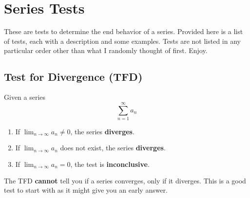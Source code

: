 \documentclass[12pt]{report}
\begin{document}
\clearpage











\chapter{Series Tests}
These are tests to determine the end behavior of a series. Provided here is a list of tests, each with a description and some examples. Tests are not listed in any particular order other than what I randomly thought of first. Enjoy.




\section{Test for Divergence (TFD)}
Given a series
    $$\sum_{n=1}^\infty a_n$$

\begin{enumerate}
	\item If $ \lim_{n\to\infty} a_n \neq 0 $, the series \textbf{diverges}.
	\item If $ \lim_{n\to\infty} a_n $ does not exist, the series \textbf{diverges}.
	\item If $ \lim_{n\to\infty} a_n = 0 $, the test is \textbf{inconclusive}.
\end{enumerate}

\noindent The TFD \textbf{cannot} tell you if a series converges, only if it diverges. This is a good test to start with as it might give you an early answer.
\end{document}

